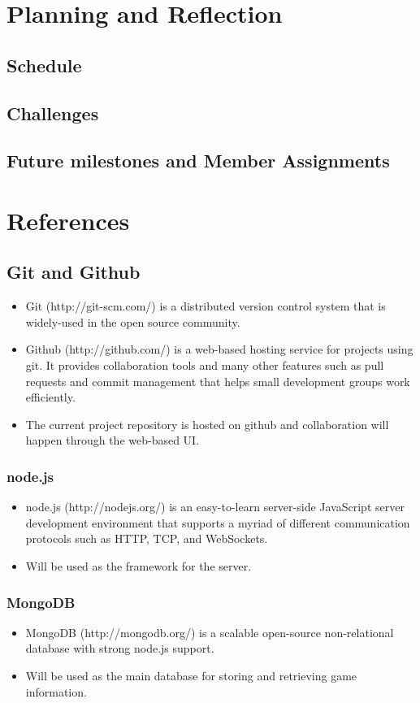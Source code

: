 \documentclass[letterpaper,12pt]{article}
\begin{document}
\section{Planning and Reflection}
\subsection{Schedule}
\subsection{Challenges}
\subsection{Future milestones and Member Assignments}
\section{References}
\subsection{Git and Github}
	\begin{itemize}
		\item Git (http://git-scm.com/) is a distributed version control system that is widely-used in the open source community.
		\item Github (http://github.com/) is a web-based hosting service for projects using git. It provides collaboration tools and many other features such as pull requests and commit management that helps small development groups work efficiently.
		\item The current project repository is hosted on github and collaboration will happen through the web-based UI.
	\end{itemize}
\subsubsection{node.js}
	\begin{itemize}
		\item node.js (http://nodejs.org/) is an easy-to-learn server-side JavaScript server development environment that supports a myriad of different communication protocols such as HTTP, TCP, and WebSockets.
		\item Will be used as the framework for the server.
	\end{itemize}
\subsubsection{MongoDB}
	\begin{itemize}
		\item MongoDB (http://mongodb.org/) is a scalable open-source non-relational database with strong node.js support.
		\item Will be used as the main database for storing and retrieving game information.
	\end{itemize}
\end{document}
